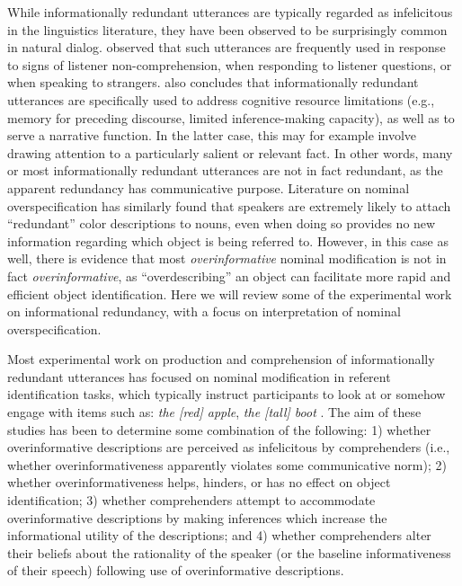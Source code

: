 While informationally redundant utterances are typically regarded as
infelicitous in the linguistics literature, they have been observed to
be surprisingly common in natural dialog. \citet{Baker2008} observed
that such utterances are frequently used in response to signs of
listener non-comprehension, when responding to listener questions, or
when speaking to strangers. \citet{Walker1993} also concludes that
informationally redundant utterances are specifically used to address
cognitive resource limitations (e.g., memory for preceding discourse,
limited inference-making capacity), as well as to serve a narrative
function. In the latter case, this may for example involve drawing
attention to a particularly salient or relevant fact. In other words,
many or most informationally redundant utterances are not in fact
redundant, as the apparent redundancy has communicative purpose.
Literature on nominal overspecification has similarly found that
speakers are extremely likely to attach \enquote{redundant} color
descriptions to nouns, even when doing so provides no new information
regarding which object is being referred to. However, in this case as
well, there is evidence that most \emph{overinformative} nominal
modification is not in fact \emph{overinformative}, as
\enquote{overdescribing} an object can facilitate more rapid and
efficient object identification. Here we will review some of the
experimental work on informational redundancy, with a focus on
interpretation of nominal overspecification.

Most experimental work on production and comprehension of
informationally redundant utterances has focused on nominal modification
in referent identification tasks, which typically instruct participants
to look at or somehow engage with items such as: \emph{the {[}red{]}
apple}, \emph{the {[}tall{]} boot} \citep{Davies2010, Davies2013, Engelhardt2006, Nadig2002, Pogue2016, Sedivy2003}. The aim of these studies has been to
determine some combination of the following: 1) whether overinformative
descriptions are perceived as infelicitous by comprehenders (i.e.,
whether overinformativeness apparently violates some communicative
norm); 2) whether overinformativeness helps, hinders, or has no effect
on object identification; 3) whether comprehenders attempt to
accommodate overinformative descriptions by making inferences which
increase the informational utility of the descriptions; and 4) whether
comprehenders alter their beliefs about the rationality of the speaker
(or the baseline informativeness of their speech) following use of
overinformative descriptions.

